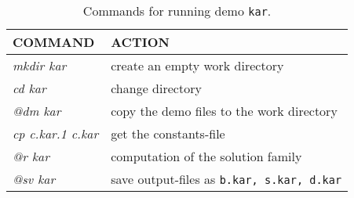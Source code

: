 \documentclass[12pt]{report}
\begin{document}
\begin{table}[htbp]
\begin{center}
\begin{tabular}{| l | l |}
\hline
  COMMAND  & ACTION \\
\hline
  {\it mkdir kar} & create an empty work directory \\ 
  {\it cd kar} & change directory \\
  {\it @dm kar} & copy the demo files to the work directory \\
\hline
  {\it cp c.kar.1 c.kar} & get the constants-file \\ 
  {\it @r kar} & computation of the solution family \\ 
  {\it @sv kar} & save output-files as {\tt b.kar, s.kar, d.kar} \\ 
\hline
\end{tabular}
\caption{Commands for running demo {\tt kar}.}
\label{tbl:demo_kar}
\end{center}
\end{table}

\newpage
\end{document}
